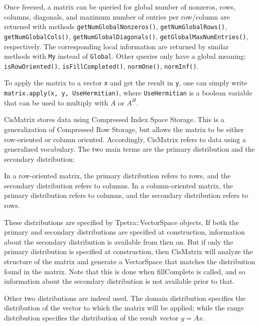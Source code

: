 \smallskip

Once freezed, a matrix can be queried for
global number of nonzeros, rows, columns, diagonals, and maximum
number of entries per row/column are returned with methods
\verb!getNumGlobalNonzeros()!,
\verb!getNumGlobalRows()!,
\verb!getNumGlobalCols()!,
\newline
\verb!getNumGlobalDiagonals()!,
\verb!getGlobalMaxNumEntries()!, respectively. The corresponding local
information are returned by similar methods with \verb!My! instead of
\verb!Global!. Other queries only have a global meaning: 
\verb!isRowOriented()!, \verb!isFillCompleted()!, \verb!normOne()!, 
  \verb!normInf()!.

\smallskip

To apply the matrix to a vector \verb!x! and get the result in
\verb!y!, one can simply write 
\newline
\verb!matrix.apply(x, y, UseHermitian)!, where
\verb!UseHermitian! is a boolean variable that can be used to multiply with
$A$ or $A^H$.

\smallskip

CisMatrix stores data using
Compressed Index Space Storage. This is a generalization of
Compressed Row Storage, but allows the matrix to be either
row-oriented or column oriented. Accordingly, CisMatrix refers to
data using a generalized vocabulary. The two main terms are the
primary distribution and the secondary distribution:

In a row-oriented matrix, the primary distribution refers to rows,
  and the secondary distribution refers to columns. In a
  column-oriented matrix, the primary distribution refers to columns,
  and the secondary distribution refers to rows.

  These distributions are specified by Tpetra::VectorSpace objects. If
  both the primary and secondary distributions are specified at
  construction, information about the secondary distribution is
  available from then on. But if only the primary distribution is
  specified at construction, then CisMatrix will analyze the structure
  of the matrix and generate a VectorSpace that matches the
  distribution found in the matrix. Note that this is done when
  fillComplete is called, and so information about the secondary
  distribution is not available prior to that.

Other two distributions are indeed used. The domain distribution specifies the
distribution of the vector to which the matrix will be applied; while the
range distribution specifies the distribution of the result vector $y = A x$.

